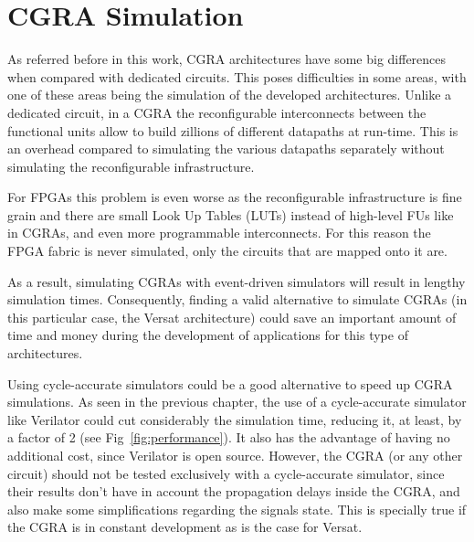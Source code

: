 

\chapter{CGRA Simulation}
\label{chapter:CGRA}

As referred before in this work, CGRA architectures have some big differences
when compared with dedicated circuits. This poses difficulties in some areas,
with one of these areas being the simulation of the developed
architectures. Unlike a dedicated circuit, in a CGRA the reconfigurable
interconnects between the functional units allow to build zillions of different
datapaths at run-time. This is an overhead compared to simulating the various
datapaths separately without simulating the reconfigurable infrastructure.

For FPGAs this problem is even worse as the reconfigurable infrastructure is
fine grain and there are small Look Up Tables (LUTs) instead of high-level FUs
like in CGRAs, and even more programmable interconnects. For this reason the
FPGA fabric is never simulated, only the circuits that are mapped onto it are.

As a result, simulating CGRAs with event-driven simulators will result in
lengthy simulation times. Consequently, finding a valid alternative to simulate
CGRAs (in this particular case, the Versat architecture) could save an important
amount of time and money during the development of applications for this type of
architectures.

Using cycle-accurate simulators could be a good alternative to speed up CGRA
simulations. As seen in the previous chapter, the use of a cycle-accurate
simulator like Verilator could cut considerably the simulation time, reducing
it, at least, by a factor of 2 (see Fig~\ref{fig:performance}). It also has the
advantage of having no additional cost, since Verilator is open source. However,
the CGRA (or any other circuit) should not be tested exclusively with a
cycle-accurate simulator, since their results don't have in account the
propagation delays inside the CGRA, and also make some simplifications regarding
the signals state. This is specially true if the CGRA is in constant development
as is the case for Versat.

